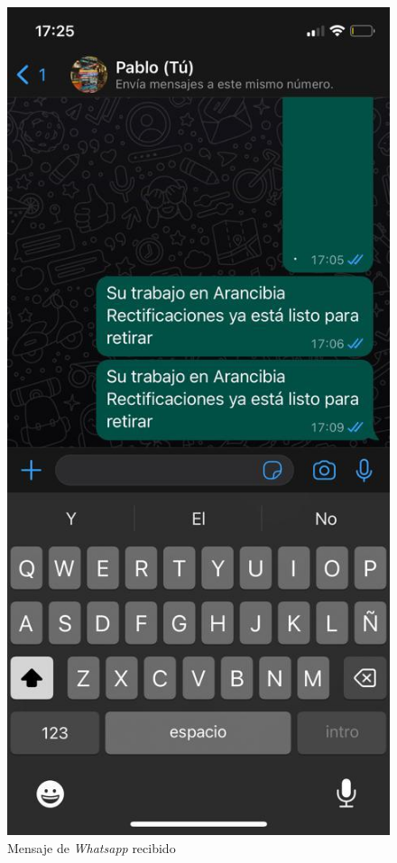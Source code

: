 \begin{figure}[H]
	\centering
	\includegraphics[scale=.20]{./Figures/ensayo-1/15.qr-api-2.jpeg}
	\caption{Mensaje de \textit{Whatsapp} recibido}
	\label{fig:ensayomensajecel2}
\end{figure}

